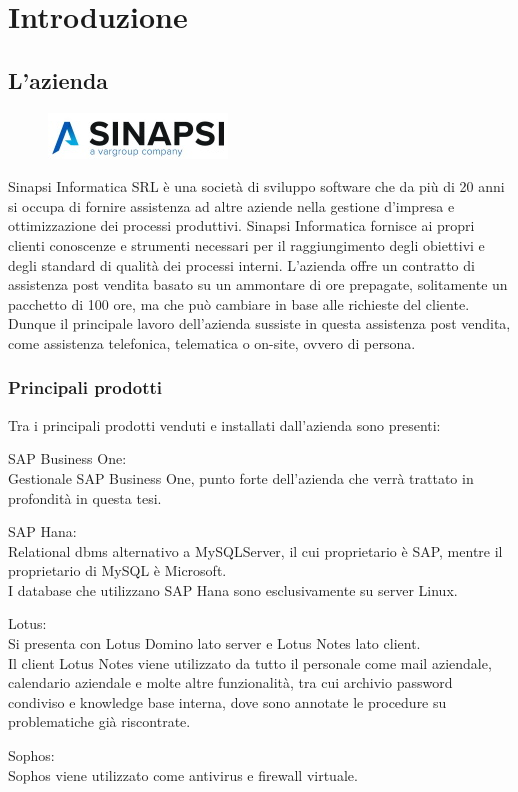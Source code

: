 
\chapter{Introduzione}
\label{cap:introduzione}

\section{L'azienda}
\begin{figure}[!h] 
	\centering 
	\includegraphics{immagini/logo_sinapsi.jpg} 
\end{figure}
Sinapsi Informatica SRL è una società di sviluppo software che da più di 20 anni si occupa di fornire assistenza ad altre aziende nella gestione d'impresa e ottimizzazione dei processi produttivi.
Sinapsi Informatica fornisce ai propri clienti conoscenze e strumenti necessari per il raggiungimento degli obiettivi e degli standard di qualità dei processi interni.
L'azienda offre un contratto di assistenza post vendita basato su un ammontare di ore prepagate, solitamente un pacchetto di 100 ore, ma che può cambiare in base alle richieste del cliente.
Dunque il principale lavoro dell'azienda sussiste in questa assistenza post vendita, come assistenza telefonica, telematica o on-site, ovvero di persona.
\subsection{Principali prodotti}
Tra i principali prodotti venduti e installati dall'azienda sono presenti:
\begin{description}
	\item {SAP Business One:} \\Gestionale SAP Business One, punto forte dell'azienda che verrà trattato in profondità in questa tesi.
	\item {SAP Hana:} \\Relational \gls{dbms} alternativo a MySQLServer, il cui proprietario è SAP, mentre il proprietario di MySQL è Microsoft.\\I database che utilizzano SAP Hana sono esclusivamente su server Linux.
	\item {Lotus:} \\Si presenta con Lotus Domino lato server e Lotus Notes lato client.\\Il client Lotus Notes viene utilizzato da tutto il personale come mail aziendale, calendario aziendale e molte altre funzionalità, tra cui archivio password condiviso e knowledge base interna, dove sono annotate le procedure su problematiche già riscontrate.
	\item {Sophos:} \\Sophos viene utilizzato come antivirus e firewall virtuale.
\end{description}



